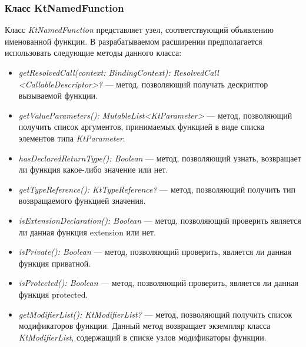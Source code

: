 \subsubsection{Класс KtNamedFunction}
\label{ssub:kt_named_function_description}
Класс \textit{KtNamedFunction} представляет узел, соответствующий объявлению
именованной функции.
В разрабатываемом расширении предполагается использовать следующие методы
данного класса:
\begin{itemize}
	\item \textit{getResolvedCall(context: BindingContext): ResolvedCall
		<CallableDescriptor>?} --- метод, позволяющий получать дескриптор
		вызываемой функции.
	\item \textit{getValueParameters(): MutableList<KtParameter>} --- метод,
		позволяющий получить список аргументов, принимаемых функцией в виде
		списка элементов типа \textit{KtParameter}.
	\item \textit{hasDeclaredReturnType(): Boolean} --- метод, позволяющий
		узнать, возвращает ли функция какое-либо значение или нет.
	\item \textit{getTypeReference(): KtTypeReference?} --- метод, позволяющий
		получить тип возвращаемого функцией значения.
	\item \textit{isExtensionDeclaration(): Boolean} --- метод, позволяющий
		проверить является ли данная функция extension или нет.
	\item \textit{isPrivate(): Boolean} --- метод, позволяющий проверить,
		является ли данная функция приватной.
	\item \textit{isProtected(): Boolean} --- метод, позволяющий проверить,
		является ли данная функция protected.
	\item \textit{getModifierList(): KtModifierList?} --- метод, позволяющий
		получить список модификаторов функции.
		Данный метод возвращает экземпляр класса \textit{KtModifierList}, содержащий
		в списке узлов модификаторы функции.
\end{itemize}
